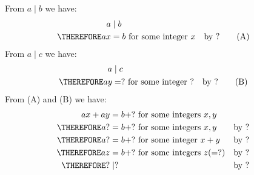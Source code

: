 From $a \mid b$ we have:
\begin{align*}
a &\mid b  \\
\THEREFORE ax &= b \text{ for some integer $x$} & & \text{by ?} \tag{A}
\end{align*}
From $a \mid c$ we have:
\begin{align*}
a &\mid c  \\
\THEREFORE ay &= ? \text{ for some integer $?$} & & \text{by ?} \tag{B}
\end{align*}
From (A) and (B) we have:
\begin{align*}
           ax + ay &= b + ? \text{ for some integers $x, y$}               \\
\THEREFORE a?  &= b + ? \text{ for some integers $x, y$}     & & \text{by ?} \\
\THEREFORE a?  &= b + ? \text{ for some integer $x + y$}     & & \text{by ?} \\
\THEREFORE az  &= b + ? \text{ for some integers $z (= ?)$}  & & \text{by ?} \\
\THEREFORE ?   &\mid ?                                       & & \text{by ?} 
\end{align*}

